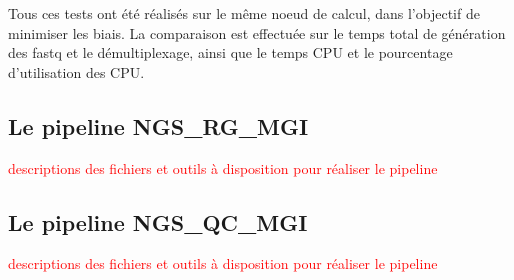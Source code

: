 Tous ces tests ont été  réalisés sur le même noeud de calcul, dans l'objectif de minimiser les biais. La comparaison est effectuée sur le temps total de génération des fastq et le démultiplexage, ainsi que le temps CPU et le pourcentage d'utilisation des CPU.

\subsection{Le pipeline NGS\_RG\_MGI}
\textcolor{red}{descriptions des fichiers et outils à disposition pour réaliser le pipeline}

\subsection{Le pipeline NGS\_QC\_MGI}
\textcolor{red}{descriptions des fichiers et outils à disposition pour réaliser le pipeline}